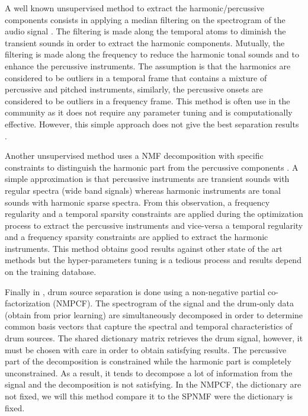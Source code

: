 \documentclass[journal]{IEEEtran}
\begin{document}
A well known unsupervised method to extract the harmonic/percussive components consists in applying a median filtering on the spectrogram of the audio signal \cite{fitzgerald2010harmonic,ono2008separation}. The filtering is made along the temporal atoms to diminish the transient sounds in order to extract the harmonic components. Mutually, the filtering is made along the frequency to reduce the harmonic tonal sounds and to enhance the percussive instruments. The assumption is that the harmonics are considered to be outliers in a temporal frame that contains a mixture of percussive and pitched instruments, similarly, the percussive onsets are considered to be outliers in a frequency frame. This method is often use in the community as it does not require any parameter tuning and is computationally effective. However, this simple approach does not give the best separation results \cite{canadas2014percussive}.

Another unsupervised method uses a NMF decomposition with specific constraints to distinguish the harmonic part from the percussive components \cite{canadas2014percussive}. A simple approximation is that percussive instruments are transient sounds with regular spectra (wide band signals) whereas harmonic instruments are tonal sounds with harmonic sparse spectra. From this observation, a frequency regularity and a temporal sparsity constraints are applied during the optimization process to extract the percussive instruments and vice-versa a temporal regularity and a frequency sparsity constraints are applied to extract the harmonic instruments. This method obtains good results against other state of the art methods \cite{canadas2014percussive} but the hyper-parameters tuning is a tedious process and results depend on the training database.

Finally in \cite{kim2011nonnegative}, drum source separation is done using a non-negative partial co-factorization (NMPCF). The spectrogram of the signal and the drum-only data (obtain from prior learning) are simultaneously decomposed in order to determine common basis vectors that capture the spectral and temporal characteristics of drum sources. The shared dictionary matrix retrieves the drum signal, however, it must be chosen with care in order to obtain satisfying results. The percussive part of the decomposition is constrained while the harmonic part is completely unconstrained. As a result, it tends to decompose a lot of information from the signal and the decomposition is not satisfying. 
 In the NMPCF, the dictionary are not fixed, we will this method compare it to the SPNMF were the dictionary is fixed. 
\end{document}
